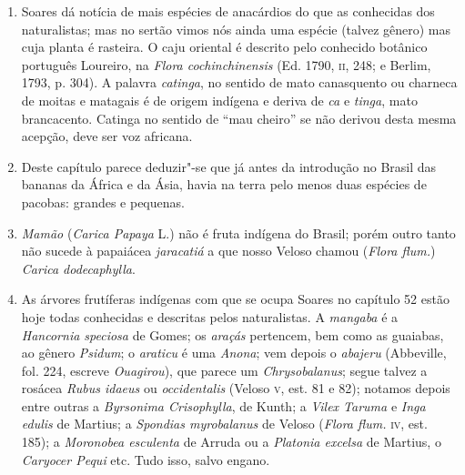 \begin{enumerate}
Não é bem que se faça pouca conta da pimenta do Brasil, porque é muito boa e não 
tem outro mal que queimar mais que a da índia, e quem muito a tem em costume folga mais 
com ela, e acha"-lhe mais gostoso que à da Índia, da qual por esse respeito se gasta pouca no 
Brasil, onde os franceses vão buscar a natural da terra, porque da casca vermelha se 
aproveitam nas tintas da mesma cor, e se quando vão resgatar a essa costa acha"-se muita dela, 
estimá"-la"-iam muito mais que o pau"-brasil; e das sementes de dentro se aproveitam 
pisando"-as bem e lançando por cima das pimentas da Índia, com o que a refinam e abatem; 
ainda que se faz este benefício a esta pimenta, poderá entrar na Espanha muita soma, se Sua 
Majestade der a licença para isso; de tal massa é esta terra da Bahia, que se lhe lançarem a 
semente do cravo o dará, como noz"-moscada, que tem o sabor dela, e dá outras árvores que 
dão canela; se for à terra quem a saiba beneficiar será como a de Ceilão, de que se dirá 
adiante.''

\item  Soares dá notícia de mais espécies de anacárdios do que as conhecidas dos 
naturalistas; mas no sertão vimos nós ainda uma espécie (talvez gênero) mas cuja planta é 
rasteira. O caju oriental é descrito pelo conhecido botânico português Loureiro, na 
\textit{Flora cochinchinensis} (Ed. 1790, \textsc{ii}, 248; e Berlim, 1793, p. 304).
A palavra \textit{catinga}, no sentido de mato canasquento ou charneca de moitas e matagais é 
de origem indígena e deriva de \textit{ca} e \textit{tinga}, mato brancacento. Catinga no sentido de ``mau 
cheiro'' se não derivou desta mesma acepção, deve ser voz africana.

\item Deste capítulo 
parece deduzir"-se que já antes da introdução no Brasil das bananas 
da África e da Ásia, havia na terra pelo menos duas espécies de pacobas: grandes e 
pequenas.

\item \textit{Mamão} (\textit{Carica Papaya} L.) não é fruta indígena do Brasil; porém outro tanto não 
sucede à papaiácea \textit{jaracatiá} a que nosso Veloso chamou (\textit{Flora flum.}) \textit{Carica dodecaphylla}.

\item As árvores frutíferas indígenas com que se ocupa Soares no capítulo 52 estão hoje 
todas conhecidas e descritas pelos naturalistas. A \textit{mangaba} é a \textit{Hancornia speciosa} de 
Gomes; os \textit{araçás} pertencem, bem como as guaiabas, ao gênero \textit{Psidum}; o \textit{araticu} é uma  
\textit{Anona}; vem depois o \textit{abajeru} (Abbeville, fol. 224, escreve \textit{Ouagirou}), que parece um \textit{Chrysobalanus}; 
segue talvez a rosácea \textit{Rubus idaeus} ou \textit{occidentalis} (Veloso \textsc{v}, est. 81 
e 82); notamos depois entre outras a \textit{Byrsonima Crisophylla}, de Kunth; a \textit{Vilex Taruma} e  
\textit{Inga edulis} de Martius; a \textit{Spondias myrobalanus} de Veloso (\textit{Flora flum.} \textsc{iv}, est. 185); a  
\textit{Moronobea esculenta} de Arruda ou a \textit{Platonia excelsa} de Martius, o \textit{Caryocer Pequi} 
etc. Tudo isso, salvo engano.


\end{enumerate}
